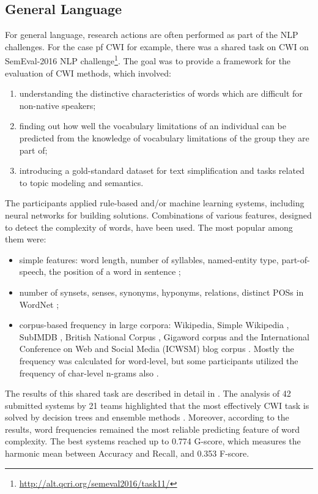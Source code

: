 \subsection{General Language}
For general language, research actions are often performed as part of the NLP challenges. For the case pf CWI for example, there was a shared task on CWI on SemEval-2016 NLP challenge\footnote{\url{http://alt.qcri.org/semeval2016/task11/}}. The goal was to provide a framework for the evaluation of CWI methods, which involved:
\begin{enumerate}
    \item understanding the distinctive characteristics of words which are difficult for non-native speakers;
    \item finding out how well the vocabulary limitations of an individual can be predicted from the knowledge of vocabulary limitations of the group they are part of;
    \item introducing a gold-standard dataset for text simplification and tasks related to topic modeling and semantics.
\end{enumerate}

The participants applied rule-based and/or
machine learning systems, including neural networks for building solutions.
Combinations of various features, designed
to detect the complexity of words, have been used. The most popular among them were: 

\begin{itemize}
    \item simple features: word length, number of syllables, named-entity type, part-of-speech, the position of a word in sentence \citep{Bingel-SemEval2016};
    
    \item number of synsets, senses, synonyms, hyponyms, relations, distinct POSs in WordNet \citep{Ronzano-SemEval2016};
    
    \item corpus-based frequency in large corpora: Wikipedia, Simple Wikipedia \citep{Kauchak-2013}, SubIMDB \citep{Paetzold-SemEval2016solution}, British National Corpus \citep{Ronzano-SemEval2016}, Gigaword corpus and the International Conference on Web and Social Media (ICWSM) blog corpus \citep{Brooke-SemEval2016}. Mostly the frequency was calculated for word-level, but some participants utilized the frequency of char-level n-grams also \citep{Bingel-SemEval2016}.
\end{itemize}

The results of this shared task are described in detail in \cite{Paetzold-SemEval2016overview}. The analysis of 42 submitted systems by 21 teams highlighted that the most effectively CWI task is solved by decision trees \citep{Malmasi-SemEval2016} and ensemble methods \citep{Paetzold-SemEval2016solution, Ronzano-SemEval2016}. Moreover, according to the results, word frequencies remained the most reliable predicting feature of word complexity. The best systems reached up to 0.774 G-score, which measures the harmonic mean between Accuracy and Recall, and 0.353 F-score. 

